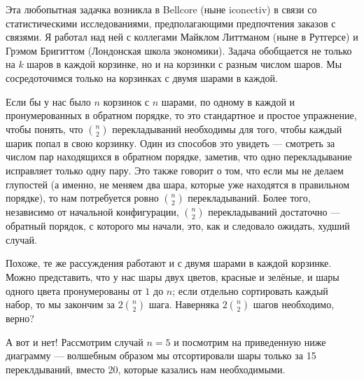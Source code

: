 Эта любопытная задачка возникла в Bellcore (ныне iconectiv) в связи со статистическими исследованиями, предполагающими предпочтения заказов с связями.
Я работал над ней с коллегами Майклом Литтманом (ныне в Рутгерсе) и Грэмом Бригиттом (Лондонская школа экономики).
Задача обобщается не только на $k$ шаров в каждой корзинке, но и на корзинки с разным числом шаров.
Мы сосредоточимся только на корзинках с двумя шарами в каждой.

Если бы у нас было $n$ корзинок с $n$ шарами, по одному в каждой и пронумерованных в обратном порядке, то это стандартное и простое упражнение, чтобы понять, что $\binom{n}{2}$ перекладываний необходимы для того, чтобы каждый шарик попал в свою корзинку.
Один из способов это увидеть --- смотреть за числом пар находящихся в обратном порядке, заметив, что одно перекладывание исправляет только одну пару.
Это также говорит о том, что если мы не делаем глупостей (а именно, не меняем два шара, которые уже находятся в правильном порядке), то нам потребуется ровно $\binom{n}{2}$ перекладываний.
Более того, независимо от начальной конфигурации, $\binom{n}{2}$ перекладываний достаточно --- обратный порядок, с которого мы начали, это, как и следовало ожидать, худший случай.

Похоже, те же рассуждения работают и с двумя шарами в каждой корзинке.
Можно представить, что у нас шары двух цветов, красные и зелёные, и шары одного цвета пронумерованы от $1$ до $n$; 
если отдельно сортировать каждый набор, то мы закончим за $2\binom{n}{2}$ шага.
Наверняка $2\binom{n}{2}$ шагов необходимо, верно?

А вот и нет!
Рассмотрим случай $n = 5$ и посмотрим на приведенную ниже диаграмму --- волшебным образом мы отсортировали шары только за 15 переклдываний, вместо 20, которые казались нам необходимыми.


